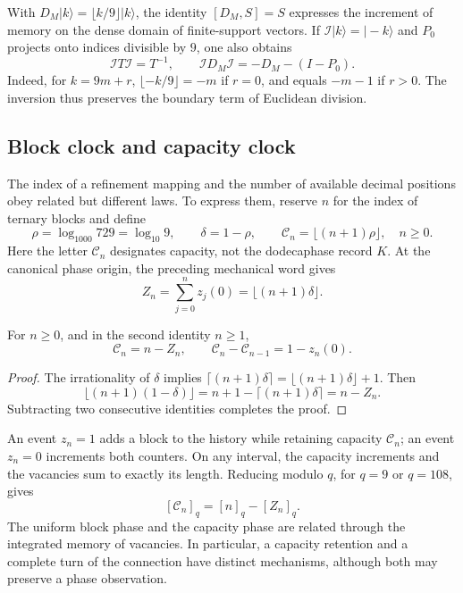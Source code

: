 With \(D_M|k\rangle=\lfloor k/9\rfloor|k\rangle\), the identity
\([D_M,S]=S\) expresses the increment of memory on the dense domain of
finite-support vectors. If \(\mathcal I|k\rangle=|-k\rangle\) and
\(P_0\) projects onto indices divisible by \(9\), one also obtains
\begin{equation}
 \mathcal I T\mathcal I=T^{-1},\qquad
 \mathcal I D_M\mathcal I=-D_M-(I-P_0).
 \label{mono-ampl:inversion-contador}
\end{equation}
Indeed, for \(k=9m+r\),
\(\lfloor-k/9\rfloor=-m\) if \(r=0\), and equals \(-m-1\) if \(r>0\).
The inversion thus preserves the boundary term of Euclidean division.

\subsection{Block clock and capacity clock}
\label{mono-ampl:relojes}

The index of a refinement mapping and the number of available decimal
positions obey related but different laws. To express them, reserve \(n\)
for the index of ternary blocks and define
\[
 \rho=\log_{1000}729=\log_{10}9,\qquad
 \delta=1-\rho,\qquad
 \mathcal C_n=\lfloor(n+1)\rho\rfloor,\quad n\geq0.
\]
Here the letter \(\mathcal C_n\) designates capacity, not the dodecaphase
record \(K\). At the canonical phase origin, the preceding mechanical word
gives
\[
 Z_n=\sum_{j=0}^{n}z_j(0)=\lfloor(n+1)\delta\rfloor.
\]

\begin{proposition}
\label{mono-ampl:balance-capacidad}
For \(n\geq0\), and in the second identity \(n\geq1\),
\[
 \mathcal C_n=n-Z_n,\qquad
 \mathcal C_n-\mathcal C_{n-1}=1-z_n(0).
\]
\end{proposition}
\begin{proof}
The irrationality of \(\delta\) implies
\(\lceil(n+1)\delta\rceil=\lfloor(n+1)\delta\rfloor+1\).
Then
\[
 \lfloor(n+1)(1-\delta)\rfloor
 =n+1-\lceil(n+1)\delta\rceil=n-Z_n.
\]
Subtracting two consecutive identities completes the proof.
\end{proof}

An event \(z_n=1\) adds a block to the history while retaining capacity
\(\mathcal C_n\); an event \(z_n=0\) increments both counters. On any
interval, the capacity increments and the vacancies sum to exactly its
length. Reducing modulo \(q\), for \(q=9\) or \(q=108\), gives
\[
 [\mathcal C_n]_q=[n]_q-[Z_n]_q.
\]
The uniform block phase and the capacity phase are related through the
integrated memory of vacancies. In particular, a capacity retention and a
complete turn of the connection have distinct mechanisms, although both may
preserve a phase observation.

